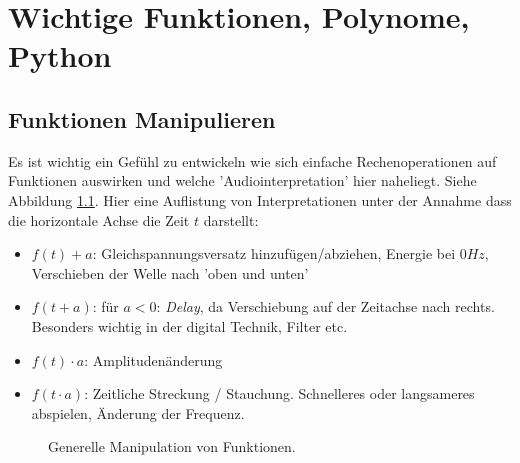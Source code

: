 \chapter{Wichtige Funktionen, Polynome, Python}




\section{Funktionen Manipulieren}\label{sec:manipFuncts}
Es ist wichtig ein Gefühl zu entwickeln wie sich einfache Rechenoperationen auf Funktionen auswirken und welche 'Audiointerpretation' hier naheliegt. Siehe Abbildung \ref{fig:functManipul}.
Hier eine Auflistung von Interpretationen unter der Annahme dass die horizontale Achse die Zeit $t$ darstellt:
\begin{itemize}
	\item $f(t) + a$: Gleichspannungsversatz hinzufügen/abziehen, Energie bei $0 Hz$, Verschieben der Welle nach 'oben und unten'
	\item $f(t+a)$: für $a<0$: \emph{Delay}, da Verschiebung auf der Zeitachse nach rechts. Besonders wichtig in der digital Technik, Filter etc. 
	\item $f(t) \cdot a$: Amplitudenänderung
	\item $f(t \cdot a)$: Zeitliche Streckung / Stauchung. Schnelleres oder langsameres abspielen, Änderung der Frequenz.

\end{itemize}

\begin{figure}[H]
	\centering
	
	\caption{Generelle Manipulation von Funktionen.}
	\label{fig:functManipul}
\end{figure}




